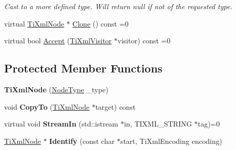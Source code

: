 \begin{DoxyCompactItemize}
\begin{DoxyCompactList}\small\item\em Cast to a more defined type. Will return null if not of the requested type. \item\end{DoxyCompactList}\item 
virtual \hyperlink{class_ti_xml_node}{TiXmlNode} $\ast$ \hyperlink{class_ti_xml_node_a4508cc3a2d7a98e96a54cc09c37a78a4}{Clone} () const =0
\item 
virtual bool \hyperlink{class_ti_xml_node_acc0f88b7462c6cb73809d410a4f5bb86}{Accept} (\hyperlink{class_ti_xml_visitor}{TiXmlVisitor} $\ast$visitor) const =0
\end{DoxyCompactItemize}
\subsection*{Protected Member Functions}
\begin{DoxyCompactItemize}
\item 
\hypertarget{class_ti_xml_node_a3f46721695868667113c7487ff123f20}{
{\bfseries TiXmlNode} (\hyperlink{class_ti_xml_node_a836eded4920ab9e9ef28496f48cd95a2}{NodeType} \_\-type)}
\label{class_ti_xml_node_a3f46721695868667113c7487ff123f20}

\item 
\hypertarget{class_ti_xml_node_ab6056978923ad8350fb5164af32d8038}{
void {\bfseries CopyTo} (\hyperlink{class_ti_xml_node}{TiXmlNode} $\ast$target) const }
\label{class_ti_xml_node_ab6056978923ad8350fb5164af32d8038}

\item 
\hypertarget{class_ti_xml_node_ab4b4af1a6b486dcbc0e327cf291270af}{
virtual void {\bfseries StreamIn} (std::istream $\ast$in, TIXML\_\-STRING $\ast$tag)=0}
\label{class_ti_xml_node_ab4b4af1a6b486dcbc0e327cf291270af}

\item 
\hypertarget{class_ti_xml_node_a0c9ec7050419887bf84dcad64f7537bd}{
\hyperlink{class_ti_xml_node}{TiXmlNode} $\ast$ {\bfseries Identify} (const char $\ast$start, TiXmlEncoding encoding)}
\label{class_ti_xml_node_a0c9ec7050419887bf84dcad64f7537bd}

\end{DoxyCompactItemize}
